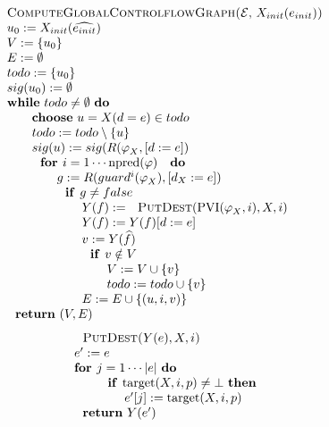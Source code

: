 \begin{equation*}
\begin{tabular}{l}
\textsc{ComputeGlobalControlflowGraph(}$\mathcal{E}$, $X_{init}(e_{init})$%
\textsc{)} \\ 
$u_{0}:=X_{init}(\widehat{e_{init}})$ \\ 
$V:=\{u_{0}\}$ \\ 
$E:=\emptyset $ \\ 
$todo:=\{u_{0}\}$ \\ 
$sig(u_{0}):=\emptyset $ \\ 
\textbf{while} $todo\neq \emptyset $ \textbf{do} \\ 
$\qquad $\textbf{choose} $u=X(d=e)\in todo$ \\ 
$\qquad todo:=todo\setminus \{u\}$ \\ 
$\qquad sig(u):=sig(R(\varphi _{X},[d:=e])$ \\ 
$\qquad \text{\textbf{for }}i=1\cdots \mathrm{npred}(\varphi )\text{ \textbf{%
do}}$ \\ 
$\qquad \qquad g:=R(guard^{i}(\varphi _{X}),[d_{X}:=e])$ \\ 
$\qquad \qquad \text{\textbf{if }}g\neq false$ \\ 
$\qquad \qquad \qquad Y(f):=\text{\textsc{PutDest}}(\mathrm{PVI}(\varphi
_{X},i),X,i)$ \\ 
$\qquad \qquad \qquad Y(f):=Y(f)[d:=e]$ \\ 
$\qquad \qquad \qquad v:=Y(\widehat{f})$ \\ 
$\qquad \qquad \qquad \text{\textbf{if }}v\notin V$ \\ 
$\qquad \qquad \qquad \qquad V:=V\cup \{v\}$ \\ 
$\qquad \qquad \qquad \qquad todo:=todo\cup \{v\}$ \\ 
$\qquad \qquad \qquad E:=E\cup \{(u,i,v)\}$ \\ 
$\text{\textbf{return} }(V,E)$%
\end{tabular}%
\end{equation*}%
\begin{equation*}
\begin{tabular}{l}
$\text{\textsc{PutDest}}$\textsc{(}$Y(e),X,i$\textsc{)} \\ 
$e^{\prime }:=e$ \\ 
\textbf{for }$j=1\cdots \left\vert e\right\vert $ \textbf{do} \\ 
$\qquad \text{\textbf{if }}\mathrm{target}(X,i,p)\neq \bot $ \textbf{then}
\\ 
$\qquad \qquad e^{\prime }[j]:=\mathrm{target}(X,i,p)$ \\ 
$\text{\textbf{return} }Y(e^{\prime })$%
\end{tabular}%
\end{equation*}
